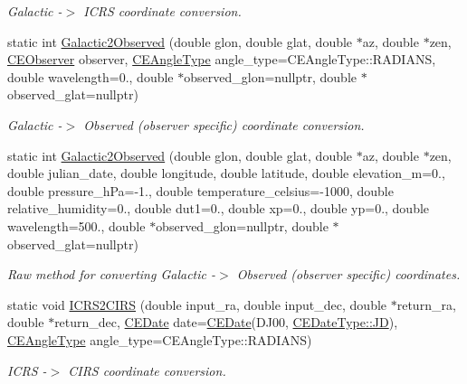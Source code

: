 \begin{DoxyCompactItemize}
\begin{DoxyCompactList}\small\item\em Galactic -\/$>$ I\+C\+R\+S coordinate conversion. \end{DoxyCompactList}\item 
static int \hyperlink{class_c_e_coordinates_a975c625831eea820a2ebb4b1c7429ca7}{Galactic2\+Observed} (double glon, double glat, double $\ast$az, double $\ast$zen, \hyperlink{class_c_e_observer}{C\+E\+Observer} observer, \hyperlink{namespace_cpp_ephem_a9a974f6ccf329e8cb5f9208b725f15ef}{C\+E\+Angle\+Type} angle\+\_\+type=C\+E\+Angle\+Type\+::\+R\+A\+D\+I\+A\+N\+S, double wavelength=0., double $\ast$observed\+\_\+glon=nullptr, double $\ast$observed\+\_\+glat=nullptr)
\begin{DoxyCompactList}\small\item\em Galactic -\/$>$ Observed (observer specific) coordinate conversion. \end{DoxyCompactList}\item 
static int \hyperlink{class_c_e_coordinates_af9ec0c48ebb8b488932626a98338189b}{Galactic2\+Observed} (double glon, double glat, double $\ast$az, double $\ast$zen, double julian\+\_\+date, double longitude, double latitude, double elevation\+\_\+m=0., double pressure\+\_\+h\+Pa=-\/1., double temperature\+\_\+celsius=-\/1000, double relative\+\_\+humidity=0., double dut1=0., double xp=0., double yp=0., double wavelength=500., double $\ast$observed\+\_\+glon=nullptr, double $\ast$observed\+\_\+glat=nullptr)
\begin{DoxyCompactList}\small\item\em Raw method for converting Galactic -\/$>$ Observed (observer specific) coordinates. \end{DoxyCompactList}\item 
static void \hyperlink{class_c_e_coordinates_a696c97fd9243fa7f6a18f746983d7bc4}{I\+C\+R\+S2\+C\+I\+R\+S} (double input\+\_\+ra, double input\+\_\+dec, double $\ast$return\+\_\+ra, double $\ast$return\+\_\+dec, \hyperlink{class_c_e_date}{C\+E\+Date} date=\hyperlink{class_c_e_date}{C\+E\+Date}(D\+J00, \hyperlink{_c_e_date_8h_aa6b826beca26b0712061a4afc5ad7746aabf8d7515962e526421842e8456798cc}{C\+E\+Date\+Type\+::\+J\+D}), \hyperlink{namespace_cpp_ephem_a9a974f6ccf329e8cb5f9208b725f15ef}{C\+E\+Angle\+Type} angle\+\_\+type=C\+E\+Angle\+Type\+::\+R\+A\+D\+I\+A\+N\+S)
\begin{DoxyCompactList}\small\item\em I\+C\+R\+S -\/$>$ C\+I\+R\+S coordinate conversion. \end{DoxyCompactList}\item 

\end{DoxyCompactItemize}
